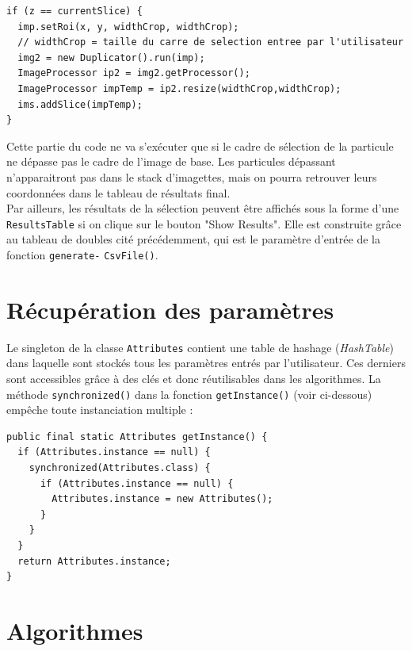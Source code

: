 \begin{small}
\begin{lstlisting}
if (z == currentSlice) {
  imp.setRoi(x, y, widthCrop, widthCrop);  
  // widthCrop = taille du carre de selection entree par l'utilisateur
  img2 = new Duplicator().run(imp);
  ImageProcessor ip2 = img2.getProcessor();
  ImageProcessor impTemp = ip2.resize(widthCrop,widthCrop);
  ims.addSlice(impTemp);
}
\end{lstlisting}
\end{small}	

Cette partie du code ne va s'exécuter que si le cadre de sélection de la particule ne dépasse pas le cadre de l'image de base. Les particules dépassant n'apparaitront pas dans le stack d'imagettes, mais on pourra retrouver leurs coordonnées dans le tableau de résultats final. \\

Par ailleurs, les résultats de la sélection peuvent être affichés sous la forme d'une \texttt{ResultsTable} si on clique sur le bouton "Show Results". Elle est construite grâce au tableau de doubles cité précédemment, qui est le paramètre d'entrée de la fonction \texttt{generate-} \texttt{CsvFile()}. 

\section{Récupération des paramètres}

Le singleton de la classe \texttt{Attributes} contient une table de hashage (\emph{HashTable}) dans laquelle sont stockés tous les paramètres entrés par l'utilisateur. Ces derniers sont accessibles grâce à des clés et donc réutilisables dans les algorithmes. La méthode  \texttt{synchronized()} dans la fonction \texttt{getInstance()} (voir ci-dessous) empêche toute instanciation multiple :

\begin{small}
\begin{lstlisting}
public final static Attributes getInstance() {
  if (Attributes.instance == null) {
    synchronized(Attributes.class) {
      if (Attributes.instance == null) {
        Attributes.instance = new Attributes();
      }
    }
  }
  return Attributes.instance;
}
\end{lstlisting}
\end{small}	

\section{Algorithmes}

